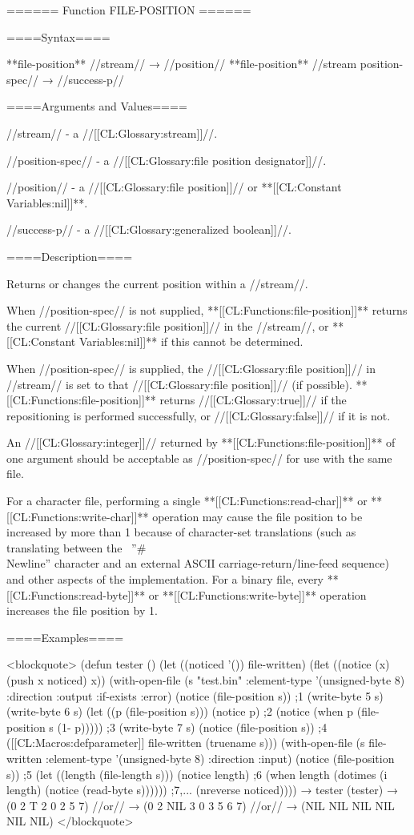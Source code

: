 ====== Function FILE-POSITION ======

====Syntax====

**file-position** //stream// → //position// **file-position** //stream position-spec// → //success-p//

====Arguments and Values====

//stream// - a //[[CL:Glossary:stream]]//.

//position-spec// - a //[[CL:Glossary:file position designator]]//.

//position// - a //[[CL:Glossary:file position]]// or **[[CL:Constant Variables:nil]]**.

//success-p// - a //[[CL:Glossary:generalized boolean]]//.

====Description====

Returns or changes the current position within a //stream//.

When //position-spec// is not supplied, **[[CL:Functions:file-position]]** returns the current //[[CL:Glossary:file position]]// in the //stream//, or **[[CL:Constant Variables:nil]]** if this cannot be determined.

When //position-spec// is supplied, the //[[CL:Glossary:file position]]// in //stream// is set to that //[[CL:Glossary:file position]]// (if possible). **[[CL:Functions:file-position]]** returns //[[CL:Glossary:true]]// if the repositioning is performed successfully, or //[[CL:Glossary:false]]// if it is not.

An //[[CL:Glossary:integer]]// returned by **[[CL:Functions:file-position]]** of one argument should be acceptable as //position-spec// for use with the same file.

For a character file, performing a single **[[CL:Functions:read-char]]** or **[[CL:Functions:write-char]]** operation may cause the file position to be increased by more than 1 because of character-set translations (such as translating between the \clisp\ ''#\\Newline'' character and an external ASCII carriage-return/line-feed sequence) and other aspects of the implementation. For a binary file, every **[[CL:Functions:read-byte]]** or **[[CL:Functions:write-byte]]** operation increases the file position by 1.

====Examples====

<blockquote> (defun tester () (let ((noticed '()) file-written) (flet ((notice (x) (push x noticed) x)) (with-open-file (s "test.bin" :element-type '(unsigned-byte 8) :direction :output :if-exists :error) (notice (file-position s)) ;1 (write-byte 5 s) (write-byte 6 s) (let ((p (file-position s))) (notice p) ;2 (notice (when p (file-position s (1- p))))) ;3 (write-byte 7 s) (notice (file-position s)) ;4 ([[CL:Macros:defparameter]] file-written (truename s))) (with-open-file (s file-written :element-type '(unsigned-byte 8) :direction :input) (notice (file-position s)) ;5 (let ((length (file-length s))) (notice length) ;6 (when length (dotimes (i length) (notice (read-byte s)))))) ;7,... (nreverse noticed)))) → tester (tester) → (0 2 T 2 0 2 5 7) //or// → (0 2 NIL 3 0 3 5 6 7) //or// → (NIL NIL NIL NIL NIL NIL) </blockquote>

